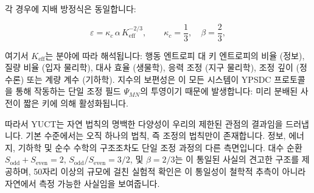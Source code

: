 \documentclass[11pt,a4paper]{article}
\newcommand{\Keff}{K_{\mathrm{eff}}}
\newcommand{\Sodd}{S_{\mathrm{odd}}}
\newcommand{\Seven}{S_{\mathrm{even}}}
\begin{document}
	각 경우에 지배 방정식은 동일합니다:
	
	\begin{equation}
		\boxed{ \varepsilon = \kappa_c \, \alpha \, K_{\mathrm{eff}}^{-2/3} },
		\qquad \kappa_c = \frac{1}{3},\quad \beta = \frac{2}{3},
	\end{equation}
	
	여기서 \(\Keff\)는 분야에 따라 해석됩니다: 행동 엔트로피 대 키 엔트로피의 비율 (정보), 질량 비율 (입자 물리학), 대사 효율 (생물학), 응력 조정 (지구 물리학), 조정 깊이 (정수론) 또는 계량 계수 (기하학). 지수의 보편성은 이 모든 시스템이 YPSDC 프로토콜을 통해 작동하는 단일 조정 필드 \(\Psi_{MN}\)의 투영이기 때문에 발생합니다: 미리 분배된 사전이 짧은 키에 의해 활성화됩니다.
	
	따라서 YUCT는 자연 법칙의 명백한 다양성이 우리의 제한된 관점의 결과임을 드러냅니다. 기본 수준에서는 오직 하나의 법칙, 즉 조정의 법칙만이 존재합니다. 정보, 에너지, 기하학 및 순수 수학의 구조조차도 단일 조정 과정의 다른 측면입니다. 대수 순환 \(\Sodd + \Seven = 2\), \(\Sodd/\Seven = 3/2\), 및 \(\beta = 2/3\)는 이 통일된 사실의 견고한 구조를 제공하며, 50자리 이상의 규모에 걸친 실험적 확인은 이 통일성이 철학적 추측이 아니라 자연에서 측정 가능한 사실임을 보여줍니다.
	
\end{document}
